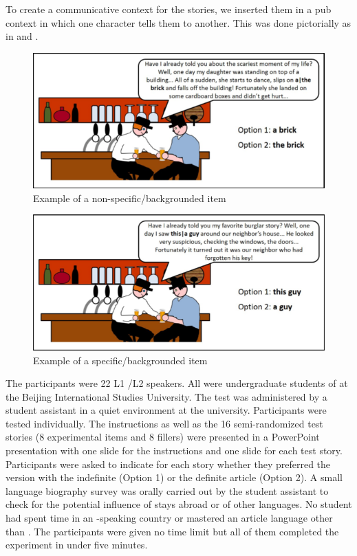 \documentclass[output=paper,
modfonts
]{langscibook}
\begin{document}
To create a communicative context for the stories, we inserted them in a pub context in which one character tells them to another. This was done pictorially as in  and .

\begin{figure}[h]
\includegraphics[height=.25\textheight]{figures/fig1.png}
\caption{Example of a non-specific/backgrounded item}
\label{fig:lebruyn:1}
\end{figure}

\begin{figure}[h]
\includegraphics[height=.25\textheight]{figures/fig2.png}
\caption{Example of a specific/backgrounded item}
\label{fig:lebruyn:2}
\end{figure}

The participants were 22 L1 /L2  speakers. All were undergraduate students of  at the Beijing International Studies University. The test was administered by a student assistant in a quiet environment at the university. Participants were tested individually. The instructions as well as the 16 semi-randomized test stories (8 experimental items and 8 fillers) were presented in a PowerPoint presentation with one slide for the instructions and one slide for each test story. Participants were asked to indicate for each story whether they preferred the version with the indefinite (Option 1) or the definite article (Option 2). A small language biography survey was orally carried out by the student assistant to check for the potential influence of stays abroad or of other languages. No student had spent time in an -speaking country or mastered an article language other than . The participants were given no time limit but all of them completed the experiment in under five minutes.
\end{document}
